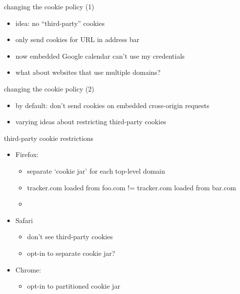 
\begin{frame}{changing the cookie policy (1)}
    \begin{itemize}
    \item idea: no ``third-party'' cookies
    \item only send cookies for URL in address bar
    \vspace{.5cm}
    \item<2> now embedded Google calendar can't use my credentials
    \item<2> what about websites that use multiple domains?
    \end{itemize}
\end{frame}

\begin{frame}{changing the cookie policy (2)}
    \begin{itemize}
    \item by default: don't send cookies on embedded cross-origin requests
    \item varying ideas about restricting third-party cookies
    \end{itemize}
\end{frame}

\begin{frame}{third-party cookie restrictions}
    \begin{itemize}
    \item Firefox:
        \begin{itemize}
        \item separate `cookie jar' for each top-level domain
        \item tracker.com loaded from foo.com != tracker.com loaded from bar.com
        \item {}
        \end{itemize}
    \item Safari
        \begin{itemize}
        \item don't see third-party cookies
        \item opt-in to separate cookie jar?
        \end{itemize}
    \item Chrome:
        \begin{itemize}
        \item opt-in to partitioned cookie jar
        \end{itemize}
    \end{itemize}
\end{frame}



